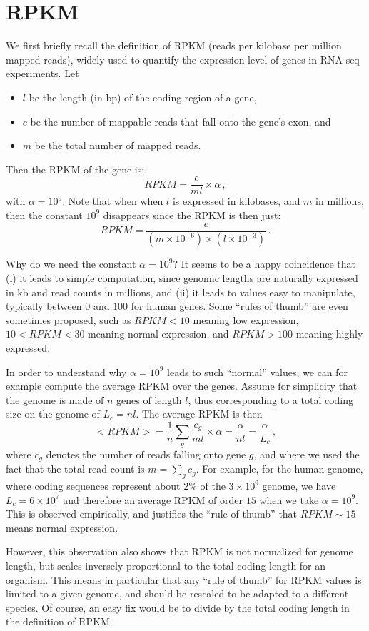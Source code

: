 \documentclass{article}
\begin{document}
\section{RPKM}

We first briefly recall the definition of RPKM (reads per kilobase per
million mapped reads), widely used to quantify the expression level
of genes in RNA-seq experiments. Let
\begin{itemize}
\item $l$ be the length (in bp) of the coding region of a gene,
\item $c$ be the number of mappable reads that fall onto the gene's
  exon, and
\item $m$ be the total number of mapped reads.
\end{itemize}
Then the RPKM of the gene is:
$$
RPKM = \frac{c}{ml}\times \alpha\,,
$$
with $\alpha=10^9$. Note that when when $l$ is expressed in kilobases, and $m$ in millions, then the constant $10^9$ disappears since the RPKM is then just:
$$
RPKM = \frac{c}{(m \times 10^{-6})\times (l \times 10^{-3})}\,.
$$

Why do we need the constant $\alpha=10^9$? It seems to be a happy
coincidence that (i) it leads to simple computation, since genomic
lengths are naturally expressed in kb and read counts in millions, and
(ii) it leads to values easy to manipulate, typically between $0$ and
$100$ for human genes. Some ``rules of thumb'' are even sometimes
proposed, such as $RPKM<10$ meaning low expression, $10<RPKM<30$
meaning normal expression, and $RPKM>100$ meaning highly expressed.

In order to understand why $\alpha=10^9$ leads to such ``normal''
values, we can for example compute the average RPKM over the
genes. Assume for simplicity that the genome is made of $n$ genes of
length $l$, thus corresponding to a total coding size on the genome of
$L_c=nl$. The average RPKM is then
\[
<RPKM> = \frac{1}{n} \sum_{g} \frac{c_g}{ml} \times \alpha = \frac{\alpha}{nl} = \frac{\alpha}{L_c}\,,
\]
where $c_g$ denotes the number of reads falling onto gene $g$, and
where we used the fact that the total read count is $m=\sum_g
c_g$. For example, for the human genome, where coding sequences
represent about $2\%$ of the $3\times 10^9$ genome, we have $L_c = 6\times 10^7$
and therefore an average RPKM of order $15$ when we take
$\alpha=10^9$. This is observed empirically, and justifies the ``rule
of thumb'' that $RPKM\sim 15$ means normal expression.

However, this observation also shows that RPKM is not normalized for
genome length, but scales inversely proportional to the total coding
length for an organism. This means in particular that any ``rule of
thumb'' for RPKM values is limited to a given genome, and should be
rescaled to be adapted to a different species. Of course, an easy fix
would be to divide by the total coding length in the definition of
RPKM.
\end{document}
